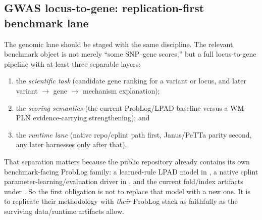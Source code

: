 \documentclass[11pt,openany]{report}
\begin{document}
\subsection{GWAS locus-to-gene: replication-first benchmark lane}

The genomic lane should be staged with the same discipline.  The relevant
benchmark object is not merely ``some SNP--gene scores,'' but a full
locus-to-gene pipeline with at least three separable layers:
\begin{enumerate}
\item the \emph{scientific task} (candidate gene ranking for a variant or
  locus, and later variant $\to$ gene $\to$ mechanism explanation);
\item the \emph{scoring semantics} (the current ProbLog/LPAD baseline versus a
  WM-PLN evidence-carrying strengthening); and
\item the \emph{runtime lane} (native repo/cplint path first, Janus/PeTTa
  parity second, any later harnesses only after that).
\end{enumerate}
That separation matters because the public
 repository already contains its own
benchmark-facing ProbLog family: a learned-rule LPAD model in
, a native cplint parameter-learning/evaluation
driver in , and the current fold/index artifacts
under .  So the first obligation is not to replace that
model with a new one.  It is to replicate their methodology with
\emph{their} ProbLog stack as faithfully as the surviving data/runtime
artifacts allow.
\end{document}
